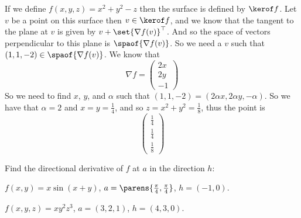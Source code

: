 \documentclass[10pt]{article}
\begin{document}
\begin{blankpp}

    If we define $f(x,y,z)=x^2+y^2-z$ then the surface is defined by $\kerof f$.
    Let $v$ be a point on this surface then $v\in\kerof f$, and we know that the tangent to the plane at $v$ is given by $v+\set{\nabla f(v)}^\top$.
    And so the space of vectors perpendicular to this plane is $\spaof{\nabla f(v)}$.
    So we need a $v$ such that $(1,1,-2)\in\spaof{\nabla f(v)}$.
    We know that
        \[ \nabla f = \begin{pmatrix} 2x\\2y\\-1 \end{pmatrix} \]
    So we need to find $x$, $y$, and $\alpha$ such that $(1,1,-2)=(2\alpha x,2\alpha y,-\alpha)$.
    So we have that $\alpha=2$ and $x=y=\frac14$, and so $z=x^2+y^2=\frac18$, thus the point is
        \[ \begin{pmatrix} \frac14 \\[1ex] \frac14 \\[1ex] \frac18 \end{pmatrix} \]

\end{blankpp}

\begin{exercise*}

    Find the directional derivative of $f$ at $a$ in the direction $h$:
    \benum
        \item $f(x,y)=x\sin(x+y)$, $a=\parens{\frac\pi4,\frac\pi4}$, $h=(-1,0)$.
        \item $f(x,y,z)=xy^2z^3$, $a=(3,2,1)$, $h=(4,3,0)$.
    \eenum

\end{exercise*}
\end{document}

